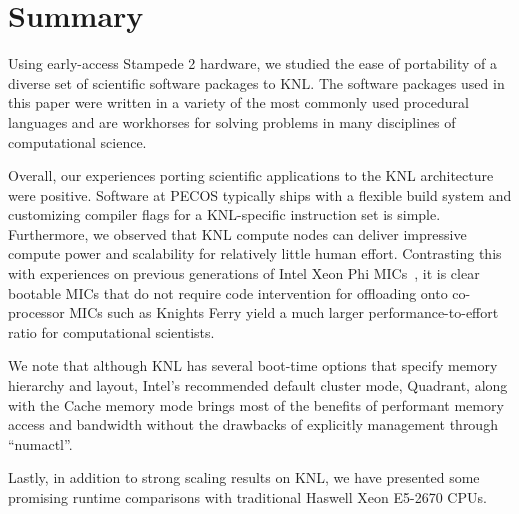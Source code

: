 \section{Summary}
\label{sec:summary}

Using early-access Stampede 2 hardware, we studied the ease of portability of a
diverse set of scientific software packages to KNL.  The software packages
used in this paper were written in a variety of the most commonly used
procedural languages and are workhorses for solving problems in many
disciplines of computational science.

Overall, our experiences porting scientific applications to the KNL
architecture were positive.  Software at PECOS typically ships with a
flexible build system and customizing compiler flags for a KNL-specific
instruction set is simple.  Furthermore, we observed that KNL compute nodes can
deliver impressive compute power and scalability for relatively little human
effort.  Contrasting this with experiences on previous generations of Intel
Xeon Phi MICs~\cite{schulz2012early}, it is clear bootable MICs that do not
require code intervention for offloading onto co-processor MICs such as Knights
Ferry yield a much larger performance-to-effort ratio for computational
scientists.

We note that although KNL has several boot-time options that specify memory
hierarchy and layout, Intel's recommended default cluster mode, Quadrant, along
with the Cache memory mode brings most of the benefits of performant memory access 
and bandwidth without the drawbacks of explicitly management through ``numactl''.

Lastly, in addition to strong scaling results on KNL, we have presented some
promising runtime comparisons with traditional Haswell Xeon E5-2670 CPUs.

